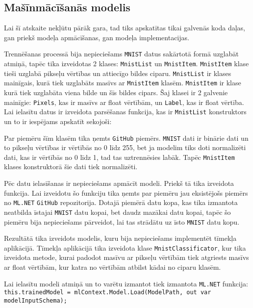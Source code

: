 \subsection{Mašīnmācīšanās modelis}

    Lai šī atskaite nekļūtu pārāk gara, tad tiks apskatītas tikai galvenās koda daļas, gan priekš
    modeļa apmācīšanas, gan modeļa implementacijas.

    Trennēšanas processā bija nepieciešams \texttt{MNIST} datus sakārtotā formā uzglabāt atmiņā, tapēc
    tika izveidotas 2 klases: \texttt{MnistList} un \texttt{MnistItem}. \texttt{MnistItem} klase tieši
    uzglabā pikseļu vērtības un attiecīgo bildes ciparu. \texttt{MnistList} ir klases mainīgais, kurā
    tiek uzglabāts masīvs ar \texttt{MnistItem} klasēm. \texttt{MnistItem} ir klase kurā tiek uzglabāta
    viena bilde un šīs bildes cipars. Šaj klasei ir 2 galvenie mainīgie: \texttt{Pixels}, kas ir masīvs
    ar float vērtībām, un \texttt{Label}, kas ir float vērtība. Lai ielasītu datus ir izveidota parsēšanas
    funkcija, kas ir \texttt{MnistList} konstruktors un to ir iespējams apskatīt sekojoši:

    

    Par piemēru šīm klasēm tika ņemts \texttt{GitHub} piemērs. \cite{paxbunPaxbunCntkMnistPractice2019}
    \texttt{MNIST} dati ir binārie dati un to pikseļu vērtības ir vērtībās no 0 līdz 255,
    bet ja modelim tiks doti normalizēti dati, kas ir vērtībās no 0 līdz 1, tad tas
    uztrennēsies labāk. Tapēc \texttt{MnistItem} klases konstruktorā šie dati tiek
    normalizēti.

    

    Pēc datu ielasīšanas ir nepieciešams apmācīt modeli. Priekš tā tika izveidota funkcija. Lai izveidotu
    šo funkciju tika ņemts par piemēru jau eksistējošs piemērs no \texttt{ML.NET} \texttt{GitHub}
    repozitorija. \cite{DotnetMachinelearningsamples2021} Dotajā piemērā datu kopa, kas tika izmantota
    neatbilda īstajai \texttt{MNIST} datu kopai, bet daudz mazākai datu kopai, tapēc šo piemēru bija
    nepieciešams pārveidot, lai tas strādātu uz īsto \texttt{MNIST} datu kopu. \cite{MNISTHandwrittenDigit}

    

    Rezultātā tika izveidots modelis, kuru bija nepieciešams implementēt tīmekļa aplikācijā.
    Tīmekļa aplikācijā tika izveidota klase \texttt{MnistClassificator}, kur tika izveidota metode, kurai
    padodot masīvu ar pikseļu vērtībām tiek atgriests masīvs ar float vērtībām, kur katra no vērtībām
    atbilst kādai no ciparu klasēm.

    

    Lai ielasītu modeli atmiņā un to varētu izmantot tiek izmantota \texttt{ML.NET} funkcija:
    \texttt{this.trainedModel = mlContext.Model.Load(ModelPath, out var modelInputSchema);}
